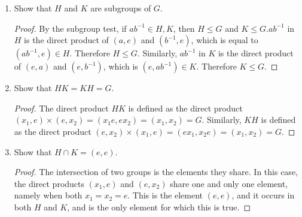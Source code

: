\documentclass[hidelinks,12pt]{article}
\begin{document}
\begin{itemize}
\begin{enumerate}[label=(\alph*)]
    \item Show that $H$ and $K$ are subgroups of $G$.\begin{proof}By the subgroup test, if $ab^{-1}\in H,K$, then $H\leqslant G$ and $K\leqslant G$.\newline $ab^{-1}$ in $H$ is the direct product of $(a,e)$ and $(b^{-1},e)$, which is equal to $(ab^{-1},e)\in H$. Therefore $H\leqslant G$. Similarly, $ab^{-1}$ in $K$ is the direct product of $(e,a)$ and $(e,b^{-1})$, which is $(e,ab^{-1})\in K$. Therefore $K\leqslant G$.
    \end{proof}
    \item Show that $HK=KH=G$.\begin{proof}The direct product $HK$ is defined as the direct product $(x_1,e)\times(e,x_2)=(x_1e,ex_2)=(x_1,x_2)=G$. Similarly, $KH$ is defined as the direct product $(e,x_2)\times(x_1,e)=(ex_1,x_2e)=(x_1,x_2)=G$.
    \end{proof}
    \item Show that $H\cap K=(e,e)$.\begin{proof}The intersection of two groups is the elements they share. In this case, the direct products $(x_1,e)$ and $(e,x_2)$ share one and only one element, namely when both $x_1=x_2=e$. This is the element $(e,e)$, and it occurs in both $H$ and $K$, and is the only element for which this is true.
    \end{proof}
\end{enumerate}
\end{itemize}
\end{document}
